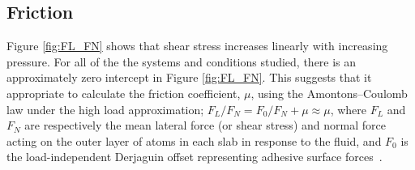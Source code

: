 \documentclass[5p]{elsarticle}
\begin{document}
\subsection{Friction}
\label{fri}

Figure \ref{fig:FL_FN} shows that shear stress increases linearly with increasing pressure. For all of the the systems and conditions studied, there is an approximately zero intercept in Figure \ref{fig:FL_FN}. This suggests that it appropriate to calculate the friction coefficient, $\mu$, using the Amontons–Coulomb law under the high load approximation; $F_L/F_N = F_0/F_N + \mu \approx \mu$, where $F_L$ and $F_N$ are respectively the mean lateral force (or shear stress) and normal force acting on the outer layer of atoms in each slab in response to the fluid, and $F_0$ is the load-independent Derjaguin offset representing adhesive surface forces~\cite{Ewen2017a}.
\end{document}
